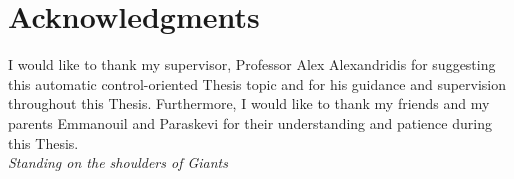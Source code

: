 \chapter*{Acknowledgments}
I would like to thank my supervisor, Professor Alex Alexandridis for suggesting this automatic control-oriented Thesis topic and for his guidance and supervision throughout this Thesis. Furthermore, I would like to thank my friends and my parents Emmanouil and Paraskevi for their understanding and patience during this Thesis.
\\

\hfill \textit{Standing on the shoulders of Giants}